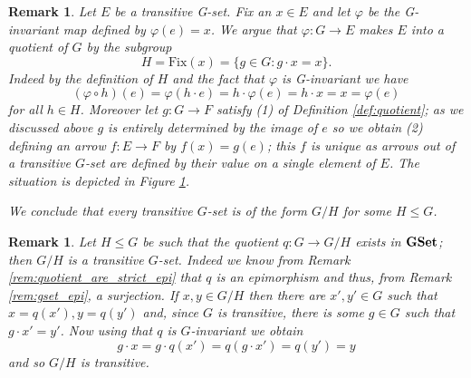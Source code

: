 \documentclass[italian, 12pt, reqno]{article}
\theoremstyle{myteo}
\newtheorem{remark}[theorem]{Remark}
\numberwithin{equation}{section}
\newcommand{\gset}{\text{\textbf{GSet}}}
\newcommand{\fix}[1]{\text{Fix}(#1)}
\newcommand{\fun}[3]{#1\colon#2\to #3}
\begin{document}
\begin{remark}
  \label{rem:transitive_actions}
  Let \(E\) be a transitive G-set.
  Fix an \(x\in E\) and let \(\varphi\) be the G-invariant map defined by \(\varphi(e) = x\).
  We argue that \(\fun{\varphi}{G}{E}\) makes \(E\) into a quotient of \(G\) by the subgroup
  \[H = \fix{x} = \{g\in G\colon g\cdot x = x\}.\]
  Indeed by the definition of \(H\) and the fact that \(\varphi\) is G-invariant we have
  \[(\varphi\circ h)(e) = \varphi(h\cdot e) = h\cdot\varphi(e) = h\cdot x = x = \varphi(e)\]
  for all \(h\in H\).
  Moreover let \(\fun{g}{G}{F}\) satisfy (1) of Definition \ref{def:quotient}; as we discussed above \(g\) is entirely determined by the image of \(e\) so we obtain (2) defining an arrow \(\fun{f}{E}{F}\) by \(f(x) = g(e)\); this \(f\) is unique as arrows out of a transitive \(G\)-set are defined by their value on a single element of \(E\).
  The situation is depicted in Figure \ref{diagram:transitive_actions}.

  We conclude that every transitive \(G\)-set is of the form \(G/H\) for some \(H \leq G\).
  

\end{remark}

\begin{remark}
  \label{rem:quotients_are_transitive}
  Let \(H \leq G\) be such that the quotient \(q: G \to G/H\) exists in \(\gset\); then \(G/H\) is a transitive \(G\)-set.
  Indeed we know from Remark \ref{rem:quotient_are_strict_epi} that \(q\) is an epimorphism and thus, from Remark \ref{rem:gset_epi}, a surjection.
  If \(x, y \in G/H\) then there are \(x', y' \in G\) such that \(x = q(x'), y = q(y')\) and, since \(G\) is transitive, there is some \(g \in G\) such that \(g \cdot x' = y'\).
  Now using that \(q\) is \(G\)-invariant we obtain
  \begin{equation*}
    g \cdot x = g \cdot q(x') = q(g \cdot x') = q(y') = y
  \end{equation*}
  and so \(G/H\) is transitive.
\end{remark}

\begin{figure}
  \begin{center}
  \end{center}
  \caption{}
  \label{diagram:transitive_actions}
\end{figure}
\end{document}

